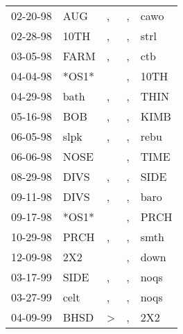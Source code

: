 \begin{supertabular}{p{0.07\textwidth}p{0.06\textwidth}p{0.02\textwidth}p{0.02\textwidth}p{0.06\textwidth}}
 02-20-98\textsuperscript{} &            AUG\textsuperscript{} &             , &  , &           cawo\textsuperscript{} \\
 02-28-98\textsuperscript{} &           10TH\textsuperscript{} &             , &  , &           strl\textsuperscript{} \\
 03-05-98\textsuperscript{} &           FARM\textsuperscript{} &             , &  , &            ctb\textsuperscript{} \\
 04-04-98\textsuperscript{} &                            *OS1* &               &  , &           10TH\textsuperscript{} \\
 04-29-98\textsuperscript{} &           bath\textsuperscript{} &             , &  , &           THIN\textsuperscript{} \\
 05-16-98\textsuperscript{} &            BOB\textsuperscript{} &             , &  , &           KIMB\textsuperscript{} \\
 06-05-98\textsuperscript{} &           slpk\textsuperscript{} &             , &  , &           rebu\textsuperscript{} \\
 06-06-98\textsuperscript{} &           NOSE\textsuperscript{} &               &  , &           TIME\textsuperscript{} \\
 08-29-98\textsuperscript{} &           DIVS\textsuperscript{} &             , &  , &           SIDE\textsuperscript{} \\
 09-11-98\textsuperscript{} &           DIVS\textsuperscript{} &             , &  , &           baro\textsuperscript{} \\
 09-17-98\textsuperscript{} &                            *OS1* &               &  , &           PRCH\textsuperscript{} \\
 10-29-98\textsuperscript{} &           PRCH\textsuperscript{} &             , &  , &           smth\textsuperscript{} \\
 12-09-98\textsuperscript{} &            2X2\textsuperscript{} &               &  , &           down\textsuperscript{} \\
 03-17-99\textsuperscript{} &           SIDE\textsuperscript{} &             , &  , &           noqs\textsuperscript{} \\
 03-27-99\textsuperscript{} &           celt\textsuperscript{} &             , &  , &           noqs\textsuperscript{} \\
 04-09-99\textsuperscript{} &           BHSD\textsuperscript{} &  \textgreater &  , &            2X2\textsuperscript{} \\

\end{supertabular}
